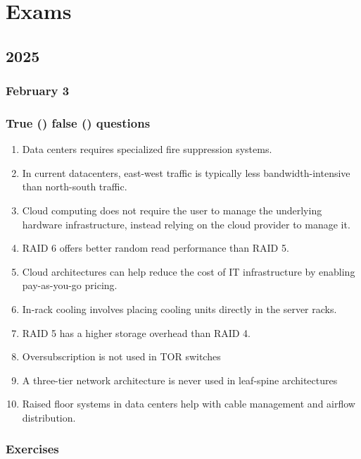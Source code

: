 \section{Exams}

\subsection{2025}

\subsubsection{February 3}

\subsubsection*{True (\trueIcon) false (\falseIcon) questions}

\begin{enumerate}
    \item \trueIcon \: Data centers requires specialized ﬁre suppression systems.
    \item \falseIcon \: In current datacenters, east-west traffic is typically less bandwidth-\break intensive than north-south traffic.
    \item \trueIcon \: Cloud computing does not require the user to manage the underlying hardware infrastructure, instead relying on the cloud provider to manage it.
    \item \falseIcon \: RAID 6 offers better random read performance than RAID 5.
    \item \trueIcon \: Cloud architectures can help reduce the cost of IT infrastructure by enabling pay-as-you-go pricing.
    \item \trueIcon \: In-rack cooling involves placing cooling units directly in the server racks.
    \item \falseIcon \: RAID 5 has a higher storage overhead than RAID 4.
    \item \falseIcon \: Oversubscription is not used in TOR switches
    \item \falseIcon \: A three-tier network architecture is never used in leaf-spine architectures
    \item \trueIcon \: Raised floor systems in data centers help with cable management and airflow distribution.
\end{enumerate}

\subsubsection*{Exercises}

